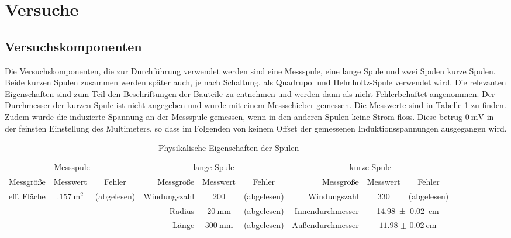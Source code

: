 \section{Versuche}
\subsection{Versuchskomponenten}
Die Versuchskomponenten, die zur Durchführung verwendet werden sind eine Messspule, eine lange Spule und zwei Spulen kurze Spulen. Beide kurzen Spulen zusammen werden später auch, je nach Schaltung, als Quadrupol und Helmholtz-Spule verwendet wird. Die relevanten Eigenschaften sind zum Teil den Beschriftungen der Bauteile zu entnehmen und werden dann als nicht Fehlerbehaftet angenommen. Der Durchmesser der kurzen Spule ist nicht angegeben und wurde mit einem Messschieber gemessen. Die Messwerte sind in Tabelle \ref{tab:eigenschaftenSpulen} zu finden. Zudem wurde die induzierte Spannung an der Messspule gemessen, wenn in den anderen Spulen keine Strom floss. Diese betrug $ \SI{0}{\milli\volt} $ in der feinsten Einstellung des Multimeters, so dass im Folgenden von keinem Offset der gemessenen Induktionsspannungen ausgegangen wird.
\begin{landscape}
\begin{table}
\thispagestyle{plain}
\begin{tabular}{r|cc||r|cc||r|cc}
	\multicolumn{3}{c}{Messspule} & \multicolumn{3}{c}{lange Spule} & \multicolumn{3}{c}{kurze Spule} \\
	Messgröße & Messwert & Fehler & Messgröße & Messwert & Fehler & Messgröße & Messwert & Fehler \\ \hline
	eff. Fläche & $ \SI{.157}{\square\meter} $ & (abgelesen) & Windungszahl & $ 200 $ & (abgelesen) & Windungszahl & 330 & (abgelesen) \\
	& & & Radius & $ \SI{20}{\milli\meter} $ & (abgelesen) & Innendurchmesser & \multicolumn{2}{c}{\SI{14.98(2)}{\centi\meter}} \\
	& & & Länge & $ \SI{300}{\milli\meter} $ & (abgelesen) & Außendurchmesser & \multicolumn{2}{c}{$ \SI{11.98(2)}{\centi\meter} $}	
\end{tabular}
\label{tab:eigenschaftenSpulen}
\caption{Physikalische Eigenschaften der Spulen}
\end{table}
\end{landscape}

